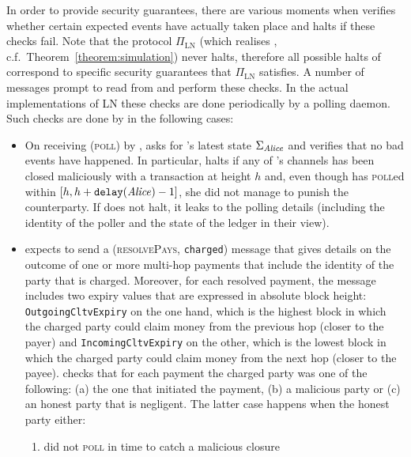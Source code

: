   In order to provide security guarantees, there are various moments when
  \fpaynet{} verifies whether certain expected events have actually taken place and halts if these checks fail. Note that the protocol $\Pi_{\mathrm{LN}}$
  (which realises \fpaynet, c.f.\ Theorem~\ref{theorem:simulation}) never halts,
  therefore all possible halts of \fpaynet{} correspond to specific security
  guarantees that $\Pi_{\mathrm{LN}}$ satisfies.
  A number of messages prompt \fpaynet{} to read from \ledger{} and perform
  these checks. In the actual implementations of LN these checks are done
  periodically by a polling daemon. Such checks are done by \fpaynet{} in the
  following cases:
  \begin{itemize}
    \item On receiving (\textsc{poll}) by \alice, \fpaynet{} asks \ledger{} for
    \alice's latest state $\Sigma_{\mathit{Alice}}$ and verifies that no bad
    events have happened. In particular, \fpaynet{} halts if any of \alice's
    channels has been closed maliciously with a transaction at height $h$ and,
    even though \alice{} has \textsc{poll}ed within $[h, h +
    \mathtt{delay}(\mathit{Alice}) - 1]$, she did not manage to punish the counterparty.
    If \fpaynet{} does not halt, it leaks to \simulator{} the polling
    details (including the identity of the poller and the state of the ledger in
    their view).
    \item \fpaynet{} expects \simulator{} to send a (\textsc{resolvePays},
    \texttt{charged}) message that gives details on the outcome of one or more
    multi-hop payments that include the identity of the party that is charged.
    Moreover, for each resolved payment, the message includes two expiry
    values that are expressed in absolute block height:
    \texttt{OutgoingCltvExpiry} on the one hand, which is the highest block in
    which the charged party could claim money from the previous hop (closer to
    the payer) and \texttt{IncomingCltvExpiry} on the other, which is the
    lowest block in which the charged party could claim money from the
    next hop (closer to the payee). \fpaynet{} checks that for each
    payment the charged party was one of the following: (a) the one that
    initiated the payment, (b) a malicious party or (c) an honest party that is
    negligent. The latter case happens when the honest party either:
    \begin{enumerate}
      \item did not \textsc{poll} in time to catch a malicious closure

\end{enumerate}
\end{itemize}
